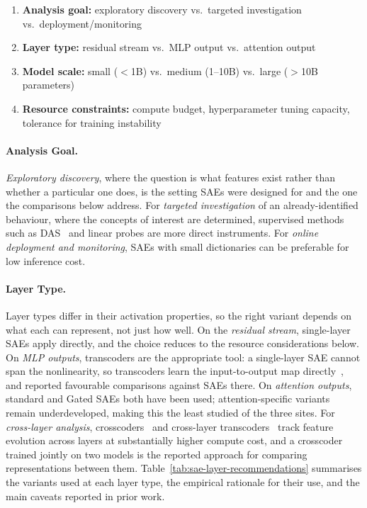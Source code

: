 \begin{enumerate}
    \item \textbf{Analysis goal:} exploratory discovery vs.\ targeted investigation vs.\ deployment/monitoring
    \item \textbf{Layer type:} residual stream vs.\ MLP output vs.\ attention output
    \item \textbf{Model scale:} small ($<$1B) vs.\ medium (1--10B) vs.\ large ($>$10B parameters)
    \item \textbf{Resource constraints:} compute budget, hyperparameter tuning capacity, tolerance for training instability
\end{enumerate}

\paragraph{Analysis Goal.}
\emph{Exploratory discovery}, where the question is what features exist rather than whether
a particular one does, is the setting SAEs were designed for and the one the comparisons
below address. For \emph{targeted investigation} of an already-identified behaviour, where the concepts of interest are determined, supervised methods such as DAS~ and linear probes are more direct instruments. For \emph{online deployment and monitoring}, SAEs with small dictionaries can be preferable for low inference cost.

\paragraph{Layer Type.}
Layer types differ in their activation properties, so the right variant depends on what each can represent, not just how well. On the \emph{residual stream}, single-layer SAEs
apply directly, and the choice reduces to the resource considerations below. On \emph{MLP
outputs}, transcoders are the appropriate tool: a single-layer SAE cannot span the
nonlinearity, so transcoders learn the input-to-output map
directly~, and
 reported favourable comparisons against
SAEs there. On \emph{attention outputs}, standard and Gated SAEs both have been used;
attention-specific variants remain underdeveloped, making this the least studied of the three
sites. For \emph{cross-layer analysis}, crosscoders~
and cross-layer transcoders~ track feature evolution across
layers at substantially higher compute cost, and a crosscoder trained jointly on two models
is the reported approach for comparing representations between them. Table~\ref{tab:sae-layer-recommendations} summarises the variants used at each layer type, the empirical rationale for their use, and the main caveats reported in prior work.

